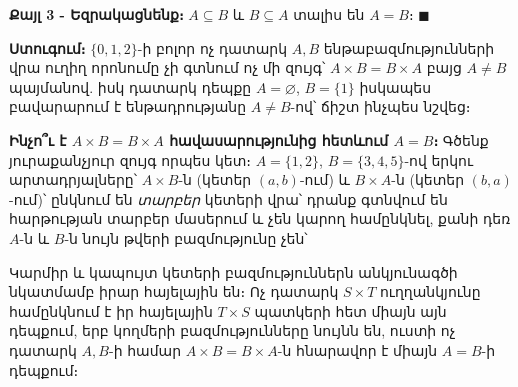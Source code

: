 \documentclass[11pt,a4paper]{article}
\begin{document}
\textbf{Քայլ 3 - Եզրակացնենք։}
$A\subseteq B$ և $B\subseteq A$ տալիս են $A=B$։ $\blacksquare$

\textbf{Ստուգում։} $\{0,1,2\}$-ի բոլոր ոչ դատարկ $A,B$ ենթաբազմությունների վրա ուղիղ որոնումը չի գտնում
ոչ մի զույգ՝ $A\times B=B\times A$ բայց $A\neq B$ պայմանով. իսկ դատարկ դեպքը $A=\varnothing$, $B=\{1\}$
իսկապես բավարարում է ենթադրությանը $A\neq B$-ով՝ ճիշտ ինչպես նշվեց։ \checkmark

\textbf{Ինչո՞ւ է $A\times B=B\times A$ հավասարությունից հետևում $A=B$։} Գծենք յուրաքանչյուր զույգ որպես կետ։ $A=\{1,2\}$,
$B=\{3,4,5\}$-ով երկու արտադրյալները՝ $A\times B$-ն (կետեր $(a,b)$-ում) և $B\times A$-ն (կետեր
$(b,a)$-ում)՝ ընկնում են \emph{տարբեր} կետերի վրա՝ դրանք գտնվում են հարթության տարբեր մասերում և չեն կարող
համընկնել, քանի դեռ $A$-ն և $B$-ն նույն թվերի բազմությունը չեն՝

\begin{center}
\end{center}
Կարմիր և կապույտ կետերի բազմություններն անկյունագծի նկատմամբ իրար հայելային են։ Ոչ դատարկ $S\times T$
ուղղանկյունը համընկնում է իր հայելային $T\times S$ պատկերի հետ միայն այն դեպքում, երբ կողմերի
բազմությունները նույնն են, ուստի ոչ դատարկ $A,B$-ի համար $A\times B=B\times A$-ն հնարավոր է միայն $A=B$-ի դեպքում։
\end{document}
